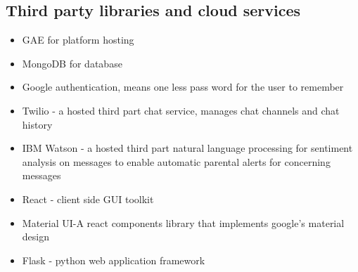 \documentclass[a4paper,10pt]{article}
\begin{document}
\subsection{Third party libraries and cloud services}

\begin{itemize}
\item GAE for platform hosting
\item MongoDB for database
\item Google authentication, means one less pass word for the user to remember
\item Twilio - a hosted third part chat service, manages chat channels and chat history
\item IBM Watson - a hosted third part natural language processing for sentiment analysis on messages to enable automatic parental alerts for concerning messages
\item  React - client side GUI toolkit
\item  Material UI-A react components library that implements google's material design
\item Flask - python web application framework


\end{itemize}
\end{document}
